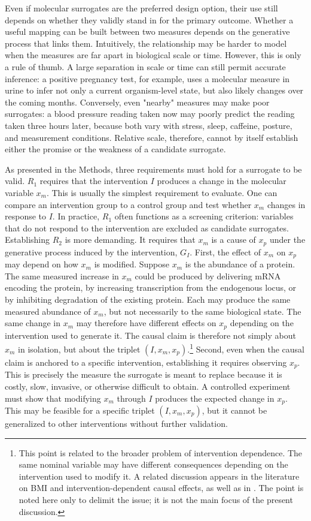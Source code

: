 \documentclass[twocolumn]{article} %
\begin{document}
Even if molecular surrogates are the preferred design option, their use still depends on whether they validly stand in for the primary outcome. Whether a useful mapping can be built between two measures depends on the generative process that links them. Intuitively, the relationship may be harder to model when the measures are far apart in biological scale or time. However, this is only a rule of thumb. A large separation in scale or time can still permit accurate inference: a positive pregnancy test, for example, uses a molecular measure in urine to infer not only a current organism-level state, but also likely changes over the coming months. Conversely, even "nearby" measures may make poor surrogates: a blood pressure reading taken now may poorly predict the reading taken three hours later, because both vary with stress, sleep, caffeine, posture, and measurement conditions. Relative scale, therefore, cannot by itself establish either the promise or the weakness of a candidate surrogate.

As presented in the Methods, three requirements must hold for a surrogate to be valid. $R_1$ requires that the intervention $I$ produces a change in the molecular variable $x_m$. This is usually the simplest requirement to evaluate. One can compare an intervention group to a control group and test whether $x_m$ changes in response to $I$. In practice, $R_1$ often functions as a screening criterion: variables that do not respond to the intervention are excluded as candidate surrogates. Establishing $R_2$ is more demanding. It requires that $x_m$ is a cause of $x_p$ under the generative process induced by the intervention, $G_I$. First, the effect of $x_m$ on $x_p$ may depend on how $x_m$ is modified. Suppose $x_m$ is the abundance of a protein. The same measured increase in $x_m$ could be produced by delivering mRNA encoding the protein, by increasing transcription from the endogenous locus, or by inhibiting degradation of the existing protein. Each may produce the same measured abundance of $x_m$, but not necessarily to the same biological state. The same change in $x_m$ may therefore have different effects on $x_p$ depending on the intervention used to generate it. The causal claim is therefore not simply about $x_m$ in isolation, but about the triplet $(I, x_m, x_p)$.\footnote{This point is related to the broader problem of intervention dependence. The same nominal variable may have different consequences depending on the intervention used to modify it. A related discussion appears in the literature on BMI and intervention-dependent causal effects, as well as in \cite{hu2025house}. The point is noted here only to delimit the issue; it is not the main focus of the present discussion.} Second, even when the causal claim is anchored to a specific intervention, establishing it requires observing $x_p$. This is precisely the measure the surrogate is meant to replace because it is costly, slow, invasive, or otherwise difficult to obtain. A controlled experiment must show that modifying $x_m$ through $I$ produces the expected change in $x_p$. This may be feasible for a specific triplet $(I, x_m, x_p)$, but it cannot be generalized to other interventions without further validation.
\end{document}
